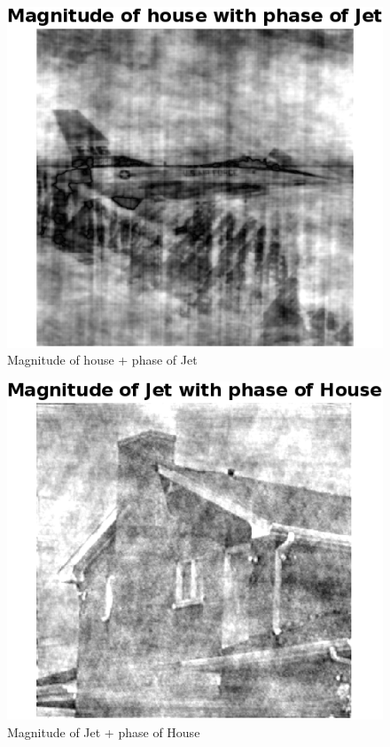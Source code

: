 \documentclass[12pt]{article}
\begin{document}
\begin{enumerate}[leftmargin=\labelsep]
\begin{enumerate}
\begin{figure}[H]
    \centering
    \includegraphics[]{Figure/Magnitude of house with phase of Jet.png}
    \caption{Magnitude of house + phase of Jet}
    \label{Q3_3}
\end{figure}

\begin{figure}[H]
    \centering
    \includegraphics[]{Figure/Magnitude of Jet with phase of House.png}
    \caption{Magnitude of Jet + phase of House}
    \label{Q3_4}
\end{figure}


\end{enumerate}
\end{enumerate}
\end{document}
